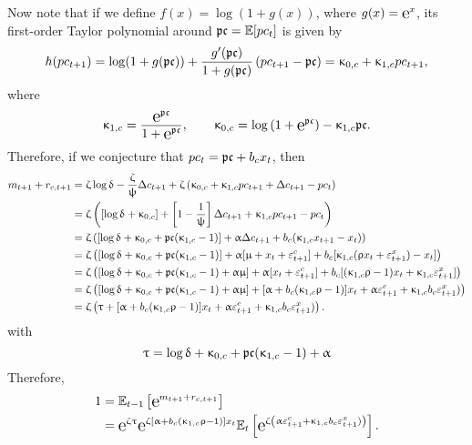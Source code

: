 Now note that if we define $f(x) = \log (1+g(x))$, where $g(x) = \e{x}$, its first-order Taylor polynomial around $\mathfrak{pc} = \mathbb{E}[pc_t]$ is given by
$$
		h(pc_{t+1}) = \log(1 + g(\mathfrak{pc})) + \frac{g'(\mathfrak{pc})}{1+g(\mathfrak{pc})} \left(pc_{t+1}-\mathfrak{pc}\right) = \upkappa_{0,c} + \upkappa_{1,c} pc_{t+1},
$$
where 
\begin{equation}\label{eq:kappas_c}
	\kappa_{1,c} = \frac{\e{\pcbar}}{1+\e{\pcbar}}, \quad\quad \kappa_{0,c} = \log\left(1+\e{\pcbar}\right)  -\kappa_{1,c}\pcbar.
\end{equation}
Therefore, if we conjecture that $pc_t = \mathfrak{pc} + b_c x_t$, then
$$
	\begin{aligned}
		m_{t+1} + r_{c,t+1} &= \upzeta \log\updelta - \frac{\upzeta}{\uppsi}\Delta c_{t+1} + \upzeta\left(\upkappa_{0,c} + \upkappa_{1,c} pc_{t+1} + \Delta c_{t+1} - pc_{t}\right)\\
		&= \upzeta\left([\log \updelta + \upkappa_{0,c}] +\left[1-\frac{1}{\uppsi}\right] \Delta c_{t+1} + \upkappa_{1,c}pc_{t+1}-pc_t\right)\\
		&=\upzeta\left([\log \updelta + \upkappa_{0,c} + \mathfrak{pc}(\upkappa_{1,c}-1)] +\upalpha \Delta c_{t+1} + b_c(\upkappa_{1,c}x_{t+1}-x_t)\right)\\
		&=\upzeta\left([\log \updelta + \upkappa_{0,c} + \mathfrak{pc}(\upkappa_{1,c}-1)] +\upalpha[\upmu + x_{t} + \varepsilon_{t+1}^c] + b_c[\upkappa_{1,c}(\uprho x_t + \varepsilon_{t+1}^x)-x_t]\right)\\
		&=\upzeta\left([\log \updelta + \upkappa_{0,c} + \mathfrak{pc}(\upkappa_{1,c}-1) + \upalpha\upmu] +\upalpha[ x_{t} + \varepsilon_{t+1}^c] + b_c[(\upkappa_{1,c}\uprho -1)x_t + \upkappa_{1,c}\varepsilon_{t+1}^x]\right)\\
		&= \upzeta\left([\log \updelta + \upkappa_{0,c} + \mathfrak{pc}(\upkappa_{1,c}-1) + \upalpha\upmu] +[\upalpha+b_c(\upkappa_{1,c}\uprho-1)]x_t + \upalpha \varepsilon_{t+1}^c  + \upkappa_{1,c}b_c\varepsilon_{t+1}^x)\right)\\
		&= \upzeta\left(\uptau  +[\upalpha+b_c(\upkappa_{1,c}\uprho-1)]x_t + \upalpha \varepsilon_{t+1}^c  + \upkappa_{1,c}b_c\varepsilon_{t+1}^x)\right).
	\end{aligned}
$$
with 
\begin{equation}
	\uptau = \log \updelta + \upkappa_{0,c} + \mathfrak{pc}(\upkappa_{1,c}-1) + \upalpha
\end{equation}
Therefore,
$$
	\begin{aligned}
		1 &= \E_{t-1}\left[\e{m_{t+1}+r_{c,t+1}}\right]\\
		&= \e{{\zeta} \tau }\e{\zeta[\alpha+b_c(\kappa_{1,c}\rho-1)]x_t }\E_t\left[\e{\zeta\left( \alpha \varepsilon_{t+1}^c  + \kappa_{1,c}b_c\varepsilon_{t+1}^x)\right)}\right].
	\end{aligned} 
$$
